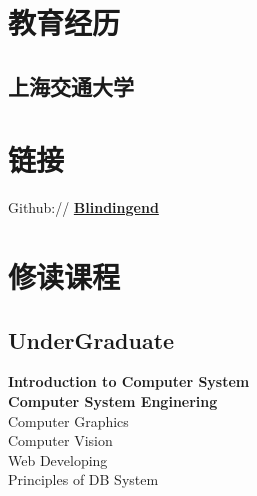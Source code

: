 \documentclass[]{deedy-resume-openfont}
\begin{document}
%
%
\lastupdated

%
%

%
%

\begin{minipage}[t]{0.3\textwidth} 


\section{教育经历} 
\sectionsep

\subsection{上海交通大学}
\sectionsep


\section{链接}
\sectionsep   
Github:// \href{https://github.com/Blindingend}{\bf Blindingend} \\
\sectionsep


\section{修读课程}
\sectionsep
\subsection{UnderGraduate}
\textbf{Introduction to Computer System} \\
\textbf{Computer System Enginering} \\
Computer Graphics \\
Computer Vision \\
Web Developing \\
Principles of DB System  \\
\sectionsep


\end{minipage}
\end{document}
